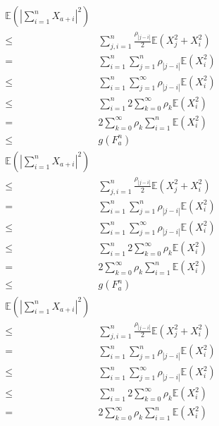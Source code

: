 \documentclass{ctexart}
\begin{document}
\begin{remark}
\begin{equation}
  \end{equation}
  \begin{equation}
    \begin{aligned}
      \mathbb{E}(|\sum_{i=1}^{n}X_{a+i}|^2) \\
      \leq & \sum_{j,i = 1}^{n} \frac{\rho_{|j-i|}}{2}\mathbb{E}(X_j^2 + X_i^2)\\
      =& \sum_{i=1}^{n} \sum_{j=1}^{n}\rho_{|j-i|}\mathbb{E}(X_i^2)\\
      \leq & \sum_{i=1}^{n} \sum_{j=1}^{\infty} \rho_{|j-i|}\mathbb{E}(X_i^2)\\
      \leq & \sum_{i=1}^{n} 2\sum_{k=0}^{\infty} \rho_k \mathbb{E}(X_i^2)\\
      =& 2\sum_{k=0}^{\infty}\rho_k  \sum_{i=1}^{n}\mathbb{E}(X_i^2)\\
      \leq & g(F_a^n)
    \end{aligned}
  \end{equation}
  \begin{equation}
    \begin{aligned}
      \mathbb{E}(|\sum_{i=1}^{n}X_{a+i}|^2) \\
      \leq & \sum_{j,i = 1}^{n} \frac{\rho_{|j-i|}}{2}\mathbb{E}(X_j^2 + X_i^2)\\
      =& \sum_{i=1}^{n} \sum_{j=1}^{n}\rho_{|j-i|}\mathbb{E}(X_i^2)\\
      \leq & \sum_{i=1}^{n} \sum_{j=1}^{\infty} \rho_{|j-i|}\mathbb{E}(X_i^2)\\
      \leq & \sum_{i=1}^{n} 2\sum_{k=0}^{\infty} \rho_k \mathbb{E}(X_i^2)\\
      =& 2\sum_{k=0}^{\infty}\rho_k  \sum_{i=1}^{n}\mathbb{E}(X_i^2)\\
      \leq & g(F_a^n)
    \end{aligned}
  \end{equation}
  \begin{equation}
    \begin{aligned}
      \mathbb{E}(|\sum_{i=1}^{n}X_{a+i}|^2) \\
      \leq & \sum_{j,i = 1}^{n} \frac{\rho_{|j-i|}}{2}\mathbb{E}(X_j^2 + X_i^2)\\
      =& \sum_{i=1}^{n} \sum_{j=1}^{n}\rho_{|j-i|}\mathbb{E}(X_i^2)\\
      \leq & \sum_{i=1}^{n} \sum_{j=1}^{\infty} \rho_{|j-i|}\mathbb{E}(X_i^2)\\
      \leq & \sum_{i=1}^{n} 2\sum_{k=0}^{\infty} \rho_k \mathbb{E}(X_i^2)\\
      =& 2\sum_{k=0}^{\infty}\rho_k  \sum_{i=1}^{n}\mathbb{E}(X_i^2)\\

\end{aligned}
\end{equation}
\end{remark}
\end{document}
